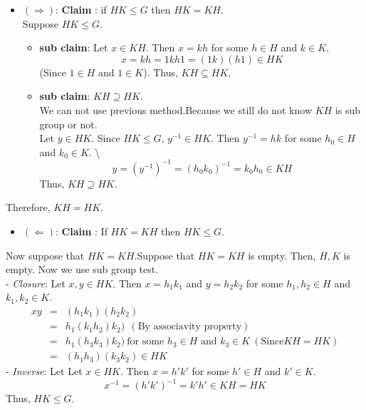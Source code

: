 \documentclass[
]{book}
\providecommand{\tightlist}{%
  \setlength{\itemsep}{0pt}\setlength{\parskip}{0pt}}
\begin{document}
\begin{itemize}
\item
  \((\Longrightarrow)\): \textbf{Claim }: if \(HK\leq G\) then
  \(HK=KH\).\\

  Suppose \(HK\leq G\).

  \begin{itemize}
  \tightlist
  \item
    \textbf{sub claim}: Let \(x\in KH\). Then \(x=kh\) for some
    \(h\in H\) and \(k\in K\), \[x=kh=1kh1=(1k)(h1)\in HK\] (Since
    \(1\in H\) and \(1\in K\)). Thus, \(KH \subseteq HK\).\\
  \item
    \textbf{sub claim}: \(KH \supseteq HK\).\\
    We can not use previous method.Because we still do not know \(KH\)
    is sub group or not.\\
    Let \(y\in HK\). Since \(HK\leq G\), \(y^{-1}\in HK\). Then
    \(y^{-1}=hk\) for some \(h_0\in H\) and \(k_0\in K\).
    \textbackslash{} \[y=(y^{-1})^{-1}=(h_0k_0)^{-1}=k_0h_0\in KH\]
    Thus, \(KH \supseteq HK\).
  \end{itemize}
\end{itemize}

Therefore, \(KH=HK\).

\begin{itemize}
\tightlist
\item
  \((\Longleftarrow)\): \textbf{Claim }: If \(HK=KH\) then
  \(HK\leq G\).\\
\end{itemize}

Now suppose that \(HK=KH\).Suppose that \(HK=KH\) is empty. Then,
\(H,K\) is empty. Now we use sub group test.\\
- \emph{Closure}: Let \(x,y\in HK\). Then \(x=h_1k_1\) and \(y=h_2k_2\)
for some \(h_1,h_2\in H\) and \(k_1,k_2\in K\). \begin{eqnarray}
  xy&=&(h_1k_1)(h_2k_2)\\
  &=& h_1(k_1h_2)k_2) ~~(\text{By associavity property})\\
  &=& h_1(h_3k_3)k_2) ~\text{for some  }h_3\in H \text{ and } k_3\in K ~(\text{Since} KH=HK)\\
  &=& (h_1h_3)(k_3k_2)\in HK
\end{eqnarray} - \emph{Inverse}: Let Let \(x\in HK\). Then \(x=h'k'\)
for some \(h'\in H\) and \(k'\in K\).
\[x^{-1}=(h'k')^{-1}=k'h'\in KH=HK\] Thus, \(HK\leq G\).
\end{document}
